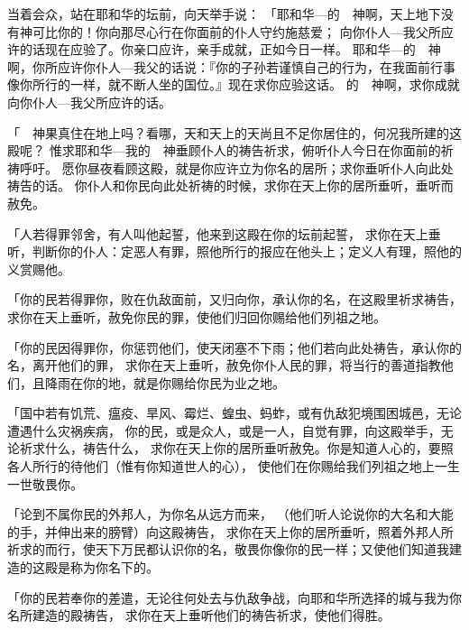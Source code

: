 {\par }{\PP {}当着{}会众，站在耶和华的坛前，向天举手说：
「耶和华—{}的　神啊，天上地下没有神可比你的！你向那尽心行在你面前的仆人守约施慈爱；
向你仆人—我父{}所应许的话现在应验了。你亲口应许，亲手成就，正如今日一样。
耶和华—{}的　神啊，你所应许你仆人—我父{}的话说：『你的子孙若谨慎自己的行为，在我面前行事像你所行的一样，就不断人坐{}的国位。』现在求你应验这话。
的　神啊，求你成就向你仆人—我父{}所应许的话。
\par }{\PP {}「　神果真住在地上吗？看哪，天和天上的天尚且不足你居住的，何况我所建的这殿呢？
惟求耶和华—我的　神垂顾仆人的祷告祈求，俯听仆人今日在你面前的祈祷呼吁。
愿你昼夜看顾这殿，就是你应许立为你名的居所；求你垂听仆人向此处祷告的话。
你仆人和你民{}向此处祈祷的时候，求你在天上你的居所垂听，垂听而赦免。
\par }{\PP {}「人若得罪邻舍，有人叫他起誓，他来到这殿在你的坛前起誓，
求你在天上垂听，判断你的仆人：定恶人有罪，照他所行的报应在他头上；定义人有理，照他的义赏赐他。
\par }{\PP {}「你的民{}若得罪你，败在仇敌面前，又归向你，承认你的名，在这殿里祈求祷告，
求你在天上垂听，赦免你民{}的罪，使他们归回你赐给他们列祖之地。
\par }{\PP {}「你的民因得罪你，你惩罚他们，使天闭塞不下雨；他们若向此处祷告，承认你的名，离开他们的罪，
求你在天上垂听，赦免你仆人{}民的罪，将当行的善道指教他们，且降雨在你的地，就是你赐给你民为业之地。
\par }{\PP {}「国中若有饥荒、瘟疫、旱风、霉烂、蝗虫、蚂蚱，或有仇敌犯境围困城邑，无论遭遇什么灾祸疾病，
你的民{}，或是众人，或是一人，自觉有罪，向这殿举手，无论祈求什么，祷告什么，
求你在天上你的居所垂听赦免。你是知道人心的，要照各人所行的待他们（惟有你知道世人的心），
使他们在你赐给我们列祖之地上一生一世敬畏你。
\par }{\PP {}「论到不属你民{}的外邦人，为你名从远方而来，
（他们听人论说你的大名和大能的手，并伸出来的膀臂）向这殿祷告，
求你在天上你的居所垂听，照着外邦人所祈求的而行，使天下万民都认识你的名，敬畏你像你的民{}一样；又使他们知道我建造的这殿是称为你名下的。
\par }{\PP {}「你的民若奉你的差遣，无论往何处去与仇敌争战，向耶和华所选择的城与我为你名所建造的殿祷告，
求你在天上垂听他们的祷告祈求，使他们得胜。
}
